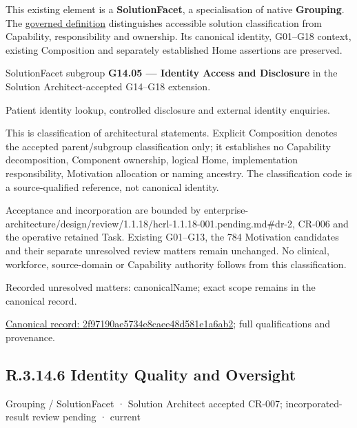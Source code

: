 This existing element is a \textbf{SolutionFacet}, a specialisation of native
\textbf{Grouping}. The \href{\detokenize{../../../../../../../governance/continuum-representation.md#solutionfacet-classification--1119-candidate}}{governed definition}
distinguishes accessible solution classification from Capability, responsibility
and ownership. Its canonical identity, G01–G18 context, existing Composition
and separately established Home assertions are preserved.



SolutionFacet subgroup \textbf{G14.05 — Identity Access and Disclosure} in the Solution Architect-accepted G14–G18 extension.



Patient identity lookup, controlled disclosure and external identity enquiries.



This is classification of architectural statements. Explicit Composition denotes the accepted parent/subgroup classification only; it establishes no Capability decomposition, Component ownership, logical Home, implementation responsibility, Motivation allocation or naming ancestry. The classification code is a source-qualified reference, not canonical identity.



Acceptance and incorporation are bounded by enterprise-architecture/design/review/1.1.18/hcrl-1.1.18-001.pending.md\#dr-2, CR-006 and the operative retained Task. Existing G01–G13, the 784 Motivation candidates and their separate unresolved review matters remain unchanged. No clinical, workforce, source-domain or Capability authority follows from this classification.


{\small Recorded unresolved matters: canonicalName; exact scope remains in the canonical record.}\par
{\footnotesize \href{../../../../../../../continuum/grouping/2f97190ae5734e8caee48d581e1a6ab2.md}{Canonical record: 2f97190ae5734e8caee48d581e1a6ab2}; full qualifications and provenance.}\par
\subsection*{R.3.14.6 Identity Quality and Oversight}
\label{navigation:R.3.14.6}

\label{element:ba2e95cc11374757bd0945148da43b07}
{\small Grouping / SolutionFacet · Solution Architect accepted CR-007; incorporated-result review pending · current}\par

